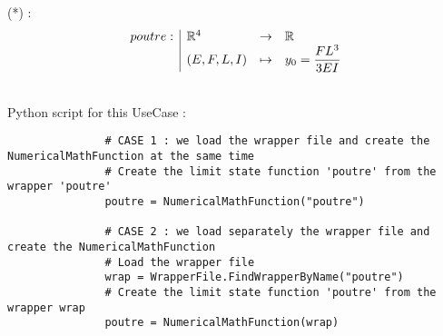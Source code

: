              (*) :
             \begin{equation}
               \label{equatPoutre}
               \begin{array}{l|lcl}
                 poutre : & {\mathbb R}^4 & \rightarrow & {\mathbb R} \\
                 & (E,F,L,I)    & \mapsto     & y_0 = \displaystyle \frac{FL^3}{3EI}
               \end{array}
             \end{equation}

             \textspace\\
             Python script for this UseCase :

             \begin{lstlisting}
               # CASE 1 : we load the wrapper file and create the NumericalMathFunction at the same time
               # Create the limit state function 'poutre' from the wrapper 'poutre'
               poutre = NumericalMathFunction("poutre")

               # CASE 2 : we load separately the wrapper file and create the NumericalMathFunction
               # Load the wrapper file
               wrap = WrapperFile.FindWrapperByName("poutre")
               # Create the limit state function 'poutre' from the wrapper wrap
               poutre = NumericalMathFunction(wrap)
             \end{lstlisting}
